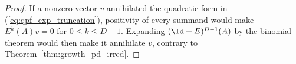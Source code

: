 \begin{proof}
    \leanok
    If a nonzero vector $v$ annihilated the quadratic form in
    (\ref{eq:qpf_exp_truncation}), positivity of every summand would make
    $E^k(A)v=0$ for $0\leq k\leq D-1$. Expanding
    $(\Id+E)^{D-1}(A)$ by the binomial theorem would then make it annihilate
    $v$, contrary to Theorem~\ref{thm:growth_pd_irred}.
\end{proof}
